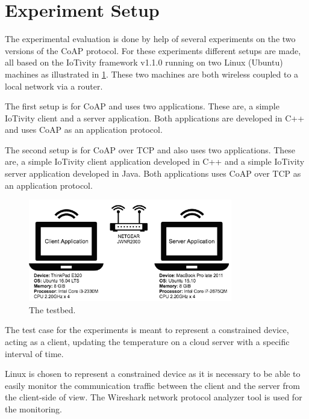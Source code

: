 \section{Experiment Setup}\label{sec:experimentsetup}
The experimental evaluation is done by help of several experiments on the two versions of the CoAP protocol. For these experiments different setups are made, all based on the IoTivity framework v1.1.0 running on two Linux (Ubuntu) machines as illustrated in \figurename \ref{fig:setup}. These two machines are both wireless coupled to a local network via a router. 

The first setup is for CoAP and uses two applications. These are, a simple IoTivity client and a server application. Both applications are developed in C++ and uses CoAP as an application protocol.

The second setup is for CoAP over TCP and also uses two applications. These are, a simple IoTivity client application developed in C++ and a simple IoTivity server application developed in Java. Both applications uses CoAP over TCP as an application protocol.

\begin{figure}[bht]
	\centering
	\includegraphics[width=3.5in]{gfx/setupa}
	\caption{The testbed.}
	\label{fig:setup}
\end{figure}

The test case for the experiments is meant to represent a constrained device, acting as a client, updating the temperature on a cloud server with a specific interval of time. 

Linux is chosen to represent a constrained device as it is necessary to be able to easily monitor the communication traffic between the client and the server from the client-side of view.
The Wireshark network protocol analyzer tool is used for the monitoring.






